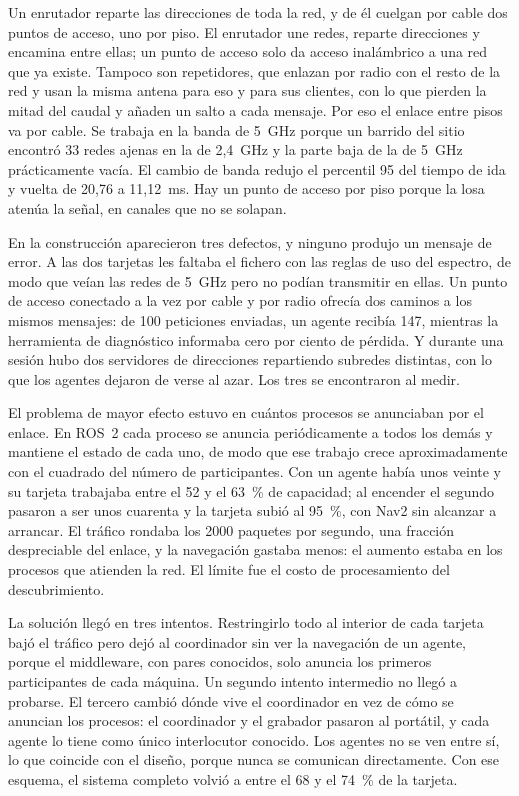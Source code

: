 Un enrutador reparte las direcciones de toda la red, y de él cuelgan por cable dos
puntos de acceso, uno por piso. El enrutador une redes, reparte direcciones y
encamina entre ellas; un punto de acceso solo da acceso inalámbrico a una red que ya
existe. Tampoco son repetidores, que enlazan por radio con el resto de la red y usan
la misma antena para eso y para sus clientes, con lo que pierden la mitad del caudal
y añaden un salto a cada mensaje. Por eso el enlace entre pisos va por cable. Se
trabaja en la banda de 5~GHz porque un barrido del sitio encontró 33 redes ajenas en
la de 2,4~GHz y la parte baja de la de 5~GHz prácticamente vacía. El cambio de banda
redujo el percentil 95 del tiempo de ida y vuelta de 20,76 a 11,12~ms. Hay un punto
de acceso por piso porque la losa atenúa la señal, en canales que no se solapan.

En la construcción aparecieron tres defectos, y ninguno produjo un mensaje de error.
A las dos tarjetas les faltaba el fichero con las reglas de uso del espectro, de
modo que veían las redes de 5~GHz pero no podían transmitir en ellas. Un punto de
acceso conectado a la vez por cable y por radio ofrecía dos caminos a los mismos
mensajes: de 100 peticiones enviadas, un agente recibía 147, mientras la herramienta
de diagnóstico informaba cero por ciento de pérdida. Y durante una sesión hubo dos
servidores de direcciones repartiendo subredes distintas, con lo que los agentes
dejaron de verse al azar. Los tres se encontraron al medir.

El problema de mayor efecto estuvo en cuántos procesos se anunciaban por el enlace.
En ROS~2 cada proceso se anuncia periódicamente a todos los demás y mantiene el
estado de cada uno, de modo que ese trabajo crece aproximadamente con el cuadrado del
número de participantes. Con un agente había unos veinte y su tarjeta trabajaba entre
el 52 y el 63~\% de capacidad; al encender el segundo pasaron a ser unos cuarenta y
la tarjeta subió al 95~\%, con Nav2 sin alcanzar a arrancar. El tráfico rondaba los
2000 paquetes por segundo, una fracción despreciable del enlace, y la navegación
gastaba menos: el aumento estaba en los procesos que atienden la red. El límite fue
el costo de procesamiento del descubrimiento.

La solución llegó en tres intentos. Restringirlo todo al interior de cada tarjeta
bajó el tráfico pero dejó al coordinador sin ver la navegación de un agente, porque
el middleware, con pares conocidos, solo anuncia los primeros participantes de cada
máquina. Un segundo intento intermedio no llegó a probarse. El tercero cambió dónde
vive el coordinador en vez de cómo se anuncian los procesos: el coordinador y el
grabador pasaron al portátil, y cada agente lo tiene como único interlocutor
conocido. Los agentes no se ven entre sí, lo que coincide con el diseño, porque nunca
se comunican directamente. Con ese esquema, el sistema completo volvió a entre el 68
y el 74~\% de la tarjeta.

